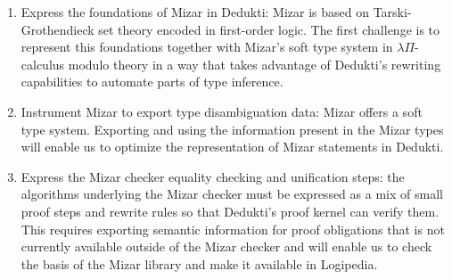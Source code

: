 
\begin{enumerate}
\item Express the foundations of Mizar in Dedukti: Mizar is based on
  Tarski-Grothendieck set theory encoded in first-order logic. The first challenge
  is to represent this foundations together with Mizar's soft type system
  in $\lambda\Pi$-calculus modulo theory in a way that takes advantage of Dedukti's
  rewriting capabilities to automate parts of type inference.
\item Instrument Mizar to export type disambiguation data: Mizar offers a soft
  type system. Exporting and using the information present in the Mizar types
  will enable us to optimize the representation of Mizar statements in Dedukti.
\item Express the Mizar checker equality checking and unification steps: the
  algorithms underlying the Mizar checker must be expressed as a mix of small
  proof steps and rewrite rules so that Dedukti's proof kernel can verify them.
  This requires exporting semantic information for proof obligations that is not
  currently available outside of the Mizar checker and will enable us to check
  the basis of the Mizar library and make it available in Logipedia.
\end{enumerate}



